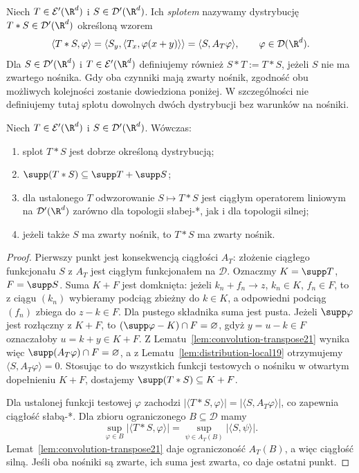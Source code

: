 \begin{definicja}
\label{def:convolution21}
Niech $T\in\mathcal E'(\R^d)$ i
$S\in\mathcal D'(\R^d)$. Ich \emph{splotem} nazywamy
dystrybucję $T*S\in\mathcal D'(\R^d)$ określoną wzorem
\[
 \langle T*S,\varphi\rangle
 =\langle S_y,\langle T_x,\varphi(x+y)\rangle\rangle
 =\langle S,A_T\varphi\rangle,
 \qquad\varphi\in\mathcal D(\R^d).
\]
Dla $S\in\mathcal D'(\R^d)$ i $T\in\mathcal E'(\R^d)$
definiujemy również $S*T:=T*S$, jeżeli $S$ nie ma
zwartego nośnika. Gdy oba czynniki mają zwarty nośnik,
zgodność obu możliwych kolejności zostanie dowiedziona
poniżej. W szczególności nie definiujemy tutaj splotu
dowolnych dwóch dystrybucji bez warunków na nośniki.
\end{definicja}

\begin{twierdzenie}
\label{thm:convolution-properties21}
Niech $T\in\mathcal E'(\R^d)$ i
$S\in\mathcal D'(\R^d)$. Wówczas:
\begin{enumerate}
\item splot $T*S$ jest dobrze określoną dystrybucją;
\item $\supp(T*S)\subseteq\supp T+\supp S$;
\item dla ustalonego $T$ odwzorowanie
$S\mapsto T*S$ jest ciągłym operatorem liniowym na
$\mathcal D'(\R^d)$ zarówno dla topologii słabej-*, jak
i dla topologii silnej;
\item jeżeli także $S$ ma zwarty nośnik, to $T*S$ ma
zwarty nośnik.
\end{enumerate}
\end{twierdzenie}
\begin{proof}
Pierwszy punkt jest konsekwencją ciągłości $A_T$:
złożenie ciągłego funkcjonału $S$ z $A_T$ jest ciągłym
funkcjonałem na $\mathcal D$. Oznaczmy $K=\supp T$, $F=\supp S$. Suma $K+F$
jest domknięta: jeżeli $k_n+f_n\to z$, $k_n\in K$,
$f_n\in F$, to z ciągu $(k_n)$ wybieramy podciąg zbieżny
do $k\in K$, a odpowiedni podciąg $(f_n)$ zbiega do
$z-k\in F$. Dla pustego składnika suma jest pusta.
Jeżeli $\supp\varphi$ jest rozłączny z $K+F$, to
$(\supp\varphi-K)\cap F=\varnothing$, gdyż
$y=u-k\in F$ oznaczałoby $u=k+y\in K+F$.
Z Lematu~\ref{lem:convolution-transpose21} wynika więc
$\supp(A_T\varphi)\cap F=\varnothing$, a z
Lematu~\ref{lem:distribution-local19} otrzymujemy
$\langle S,A_T\varphi\rangle=0$.
Stosując to do wszystkich funkcji testowych o nośniku
w otwartym dopełnieniu $K+F$, dostajemy
$\supp(T*S)\subseteq K+F$.

Dla ustalonej funkcji testowej $\varphi$ zachodzi
$|\langle T*S,\varphi\rangle|=
|\langle S,A_T\varphi\rangle|$, co zapewnia
ciągłość słabą-*. Dla zbioru ograniczonego
$B\subseteq\mathcal D$ mamy
\[
 \sup_{\varphi\in B}|\langle T*S,\varphi\rangle|
 =\sup_{\psi\in A_T(B)}|\langle S,\psi\rangle|.
\]
Lemat~\ref{lem:convolution-transpose21} daje
ograniczoność $A_T(B)$, a więc ciągłość silną.
Jeśli oba nośniki są zwarte, ich suma jest zwarta,
co daje ostatni punkt.
\end{proof}

